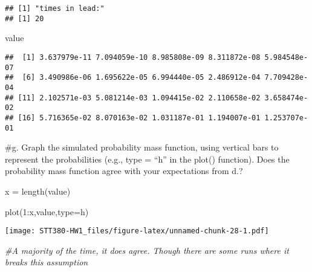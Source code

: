 \documentclass[
]{article}
\newenvironment{Shaded}{\begin{snugshade}}{\end{snugshade}}
\newcommand{\AttributeTok}[1]{\textcolor[rgb]{0.77,0.63,0.00}{#1}}
\newcommand{\CommentTok}[1]{\textcolor[rgb]{0.56,0.35,0.01}{\textit{#1}}}
\newcommand{\DecValTok}[1]{\textcolor[rgb]{0.00,0.00,0.81}{#1}}
\newcommand{\FunctionTok}[1]{\textcolor[rgb]{0.00,0.00,0.00}{#1}}
\newcommand{\NormalTok}[1]{#1}
\newcommand{\OtherTok}[1]{\textcolor[rgb]{0.56,0.35,0.01}{#1}}
\newcommand{\SpecialCharTok}[1]{\textcolor[rgb]{0.00,0.00,0.00}{#1}}
\newcommand{\StringTok}[1]{\textcolor[rgb]{0.31,0.60,0.02}{#1}}
\begin{document}
\begin{verbatim}
## [1] "times in lead:"
## [1] 20
\end{verbatim}

\begin{Shaded}
\begin{Highlighting}[]
\NormalTok{value}
\end{Highlighting}
\end{Shaded}

\begin{verbatim}
##  [1] 3.637979e-11 7.094059e-10 8.985808e-09 8.311872e-08 5.984548e-07
##  [6] 3.490986e-06 1.695622e-05 6.994440e-05 2.486912e-04 7.709428e-04
## [11] 2.102571e-03 5.081214e-03 1.094415e-02 2.110658e-02 3.658474e-02
## [16] 5.716365e-02 8.070163e-02 1.031187e-01 1.194007e-01 1.253707e-01
\end{verbatim}

\#g. Graph the simulated probability mass function, using vertical bars
to represent the probabilities (e.g., type = ``h'' in the plot()
function). Does the probability mass function agree with your
expectations from d.?

\begin{Shaded}
\begin{Highlighting}[]
\NormalTok{x }\OtherTok{=} \FunctionTok{length}\NormalTok{(value)}

\FunctionTok{plot}\NormalTok{(}\DecValTok{1}\SpecialCharTok{:}\NormalTok{x,value,}\AttributeTok{type=}\StringTok{\textquotesingle{}h\textquotesingle{}}\NormalTok{)}
\end{Highlighting}
\end{Shaded}

\texttt{[image: STT380-HW1\_files/figure-latex/unnamed-chunk-28-1.pdf]}

\begin{Shaded}
\begin{Highlighting}[]
\CommentTok{\#A majority of the time, it does agree. Though there are some runs where it breaks this assumption}
\end{Highlighting}
\end{Shaded}
\end{document}
